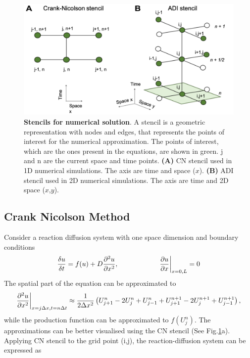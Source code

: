 \begin{figure}[H]

    \includegraphics[width=1\textwidth]{chapters/Methods/stencils}
    \caption{\textbf{Stencils for numerical solution}.  A stencil is a geometric representation with nodes and edges, that represents the points of interest for the numerical approximation. The points of interest, which are the ones present in the equations, are shown in green. j and n are the current space and time points. \textbf{(A)} \acrlong{CN} stencil used in 1D numerical simulations. The axis are time and space ($x$). \textbf{(B)} \acrshort{ADI} stencil used in 2D numerical simulations. The axis are time and 2D space ($x$,$y$).}
    \label{fig:stencils}
\end{figure}


\subsection{Crank Nicolson Method}\label{cranknicolson}
Consider a reaction diffusion system with one space dimension and boundary conditions
\begin{equation}
    \frac{\delta u}{\delta t} =  f(u) + D\frac{\partial^{2} {u}}{\partial {x}^{2}},   \quad \quad \quad \quad \quad \quad \pdv{u}{x}\biggr\rvert_{x=0,L}=0
\end{equation}
The spatial part of the equation can be approximated to
\begin{equation}
    \frac{\partial^{2} {u}}{\partial {x}^{2}} \biggr\rvert_{x=j\Delta x,t=n\Delta t} \approx \frac{1}{2\Delta x^{2}}\left( U^{n}_{j+1} -  2U^{n}_{j} + U^{n}_{j-1} + U^{n+1}_{j+1} - 2U^{n+1}_{j} + U^{n+1}_{j-1}\right),
\end{equation}
while the production function can be approximated to $f ( U^{n}_{j})$.  The approximations can be better visualised using the \acrshort{CN} stencil (See Fig.\ref{fig:stencils}a). Applying \acrshort{CN} stencil to the grid point (i,j), the reaction-diffusion system can be expressed as

